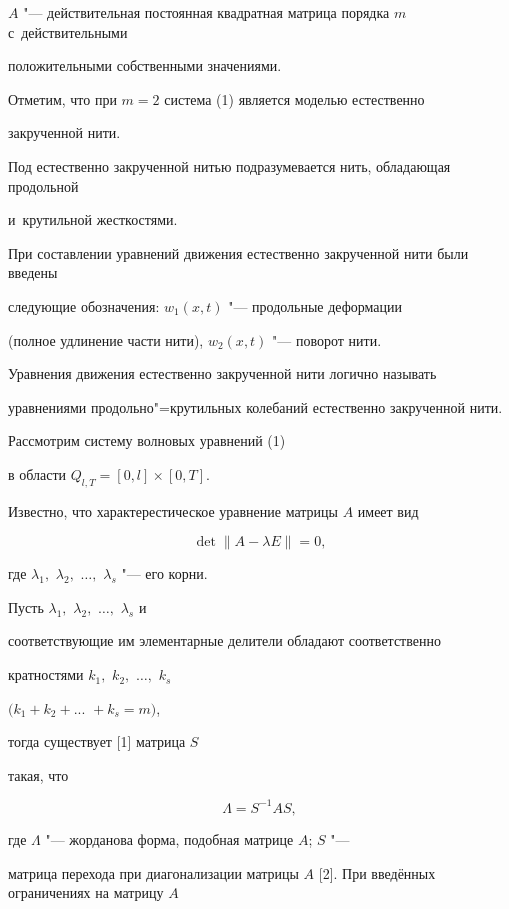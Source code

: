 $A$ "--- действительная постоянная квадратная матрица порядка $m$ с~действительными

положительными собственными значениями.



Отметим, что при  $m=2$ система (1) является моделью естественно

закрученной нити. 

Под естественно закрученной нитью подразумевается нить, обладающая продольной 

и~крутильной жесткостями. 

При составлении уравнений движения естественно закрученной нити были введены

следующие обозначения: $w_{1}(x, t)$ "--- продольные деформации

(полное удлинение части нити), $w_{2}(x, t)$ "--- поворот нити.

Уравнения движения естественно закрученной нити логично называть 

уравнениями продольно"=крутильных колебаний естественно закрученной нити.



 Рассмотрим систему волновых уравнений (1)

в области $Q_{l, T}=[0, l]\times[0, T].$



Известно, что характерестическое уравнение матрицы $A$ имеет вид

$$

\det\|A-\lambda E\|=0,

$$

где $\lambda_{1},$ $\lambda_{2},$ $\dots,$ $\lambda_{s}$ "--- его корни.

Пусть $\lambda_{1},$ $\lambda_{2},$ $\dots,$ $\lambda_{s}$ и

соответствующие им элементарные делители обладают соответственно

кратностями $k_{1},$ $k_{2},$ $\dots,$ $k_{s}$

$(k_{1}+k_{2}+...$ ${}+k_{s}=m)$, 

тогда существует [1] матрица $S$

такая, что

$$\Lambda=S^{-1}AS,$$

где $\Lambda$ "--- жорданова форма, подобная матрице $A$; $S$ "---

матрица перехода при диагонализации матрицы $A$ [2]. При введённых ограничениях на матрицу $A$


